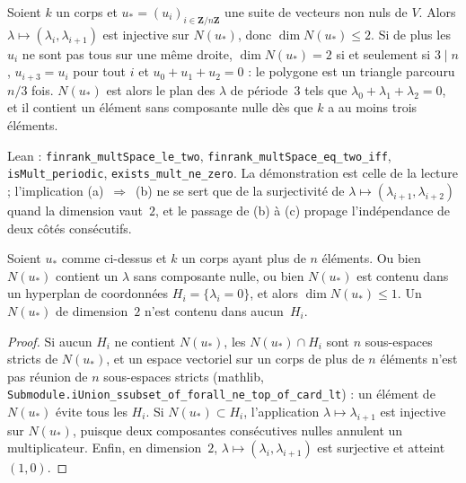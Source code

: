 \begin{encadre}
\begin{theoreme}\label{thm:73-hyperspecial}
Soient $k$ un corps et $u_* = (u_i)_{i \in \mathbf{Z}/n\mathbf{Z}}$ une suite de vecteurs non nuls de $V$. Alors $\lambda \mapsto (\lambda_i, \lambda_{i+1})$ est injective sur $N(u_*)$, donc $\dim N(u_*) \leqslant 2$. Si de plus les $u_i$ ne sont pas tous sur une même droite, $\dim N(u_*) = 2$ si et seulement si $3 \mid n$, $u_{i+3} = u_i$ pour tout $i$ et $u_0 + u_1 + u_2 = 0$ : le polygone est un triangle parcouru $n/3$ fois. $N(u_*)$ est alors le plan des $\lambda$ de période~$3$ tels que $\lambda_0 + \lambda_1 + \lambda_2 = 0$, et il contient un élément sans composante nulle dès que $k$ a au moins trois éléments.
\end{theoreme}
\end{encadre}

Lean : \texttt{finrank\_multSpace\_le\_two}, \texttt{finrank\_multSpace\_eq\_two\_iff}, \texttt{isMult\_periodic}, \texttt{exists\_mult\_ne\_zero}. La démonstration est celle de la lecture ; l'implication (a)~$\Rightarrow$~(b) ne se sert que de la surjectivité de $\lambda \mapsto (\lambda_{i+1}, \lambda_{i+2})$ quand la dimension vaut~$2$, et le passage de (b) à (c) propage l'indépendance de deux côtés consécutifs.

\begin{encadre}
\begin{theoreme}\label{thm:73-dichotomie}
Soient $u_*$ comme ci-dessus et $k$ un corps ayant plus de $n$ éléments. Ou bien $N(u_*)$ contient un $\lambda$ sans composante nulle, ou bien $N(u_*)$ est contenu dans un hyperplan de coordonnées $H_i = \{\lambda_i = 0\}$, et alors $\dim N(u_*) \leqslant 1$. Un $N(u_*)$ de dimension~$2$ n'est contenu dans aucun~$H_i$.
\end{theoreme}
\end{encadre}

\begin{proof}
Si aucun $H_i$ ne contient $N(u_*)$, les $N(u_*) \cap H_i$ sont $n$ sous-espaces stricts de $N(u_*)$, et un espace vectoriel sur un corps de plus de $n$ éléments n'est pas réunion de $n$ sous-espaces stricts (mathlib, \texttt{Submodule.\allowbreak{}iUnion\_ssubset\_of\_forall\_ne\_top\_of\_card\_lt}) : un élément de $N(u_*)$ évite tous les $H_i$. Si $N(u_*) \subset H_i$, l'application $\lambda \mapsto \lambda_{i+1}$ est injective sur $N(u_*)$, puisque deux composantes consécutives nulles annulent un multiplicateur. Enfin, en dimension~$2$, $\lambda \mapsto (\lambda_i, \lambda_{i+1})$ est surjective et atteint $(1, 0)$.
\end{proof}

